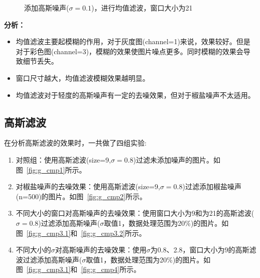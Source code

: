 \documentclass[lang=cn,10pt]{elegantbook}
\begin{document}
\begin{figure}[htbp]
	\centering
	\caption{添加高斯噪声($\sigma=0.1$)，进行均值滤波，窗口大小为21}
	\label{fig:mean_cmp4}
\end{figure}



\vspace{5pt}
\quad \textcolor{second}{\textbf{分析：}}
\begin{itemize}
\item 均值滤波主要起模糊的作用，对于灰度图(channel=1)来说，效果较好。但是对于彩色图(channel=3)，模糊的效果使图片噪点更多。同时模糊的效果会导致细节丢失。

\item 窗口尺寸越大，均值滤波模糊效果越明显。

\item 均值滤波对于轻度的高斯噪声有一定的去噪效果，但对于椒盐噪声不太适用。

\end{itemize}



\subsection{高斯滤波}

在分析高斯滤波的效果时，一共做了四组实验:
\vspace{5pt}
\begin{enumerate}[itemsep=1.5ex]

\item 对照组：使用高斯滤波(size=9,$\sigma=0.8$)过滤未添加噪声的图片。如图~\ref{fig:g_cmp1}所示。

\item 对椒盐噪声的去噪效果：使用高斯滤波(size=9,$\sigma=0.8$)过滤添加椒盐噪声(n=500)的图片。如图~\ref{fig:g_cmp2}所示。

\item 不同大小的窗口对高斯噪声的去噪效果：使用窗口大小为9和为21的高斯滤波($\sigma=0.8$)过滤添加高斯噪声($\sigma$取值1，数据处理范围为20\%)的图片。如图~\ref{fig:g_cmp3.1}和~\ref{fig:g_cmp3.2}所示。

\item 不同大小的$\sigma$对高斯噪声的去噪效果：使用$\sigma$为0.8、2.8，窗口大小为9的高斯滤波过滤添加高斯噪声($\sigma$取值1，数据处理范围为20\%)的图片。如图~\ref{fig:g_cmp3.1}和~\ref{fig:g_cmp4}所示。

\end{enumerate}
\end{document}

